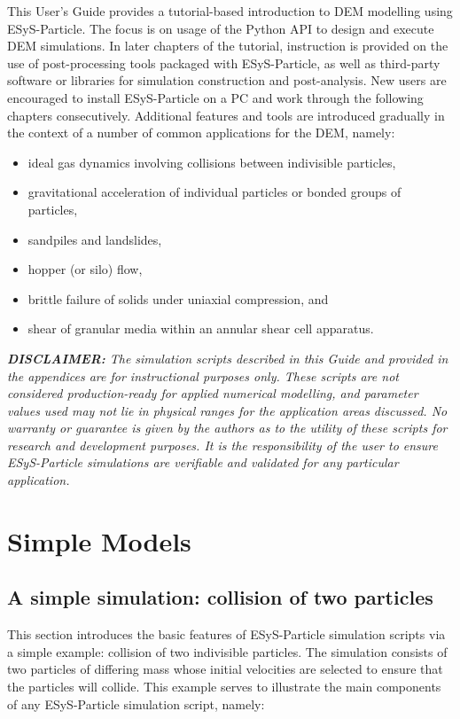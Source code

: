 This User's Guide provides a tutorial-based introduction to DEM modelling using ESyS-Particle. The focus is on usage of the Python API to design and execute DEM simulations. In later chapters of the tutorial, instruction is provided on the use of post-processing tools packaged with ESyS-Particle, as well as third-party software or libraries for simulation construction and post-analysis. New users are encouraged to install ESyS-Particle on a PC and work through the following chapters consecutively. Additional features and tools are introduced gradually in the context of a number of common applications for the DEM, namely:
\begin{itemize}
\item ideal gas dynamics involving collisions between indivisible particles,
\item gravitational acceleration of individual particles or bonded groups of particles,
\item sandpiles and landslides,
\item hopper (or silo) flow, 
\item brittle failure of solids under uniaxial compression, and
\item shear of granular media within an annular shear cell apparatus.
\end{itemize}

\vskip 5mm
\begin{minipage}{5.75in}
\emph{\textbf{DISCLAIMER:} The simulation scripts described in this Guide and provided in the appendices are for instructional purposes only. These scripts are not considered production-ready for applied numerical modelling, and parameter values used may not lie in physical ranges for the application areas discussed. No warranty or guarantee is given by the authors as to the utility of these scripts for research and development purposes. It is the responsibility of the user to ensure ESyS-Particle simulations are verifiable and validated for any particular application.}
\end{minipage}
\vskip 5mm

\chapter{Simple Models}
\section{A simple simulation: collision of two particles}

This section introduces the basic features of ESyS-Particle simulation scripts via a simple example: collision of two indivisible particles. The simulation consists of two particles of differing mass whose initial velocities are selected to ensure that the particles will collide. This example serves to illustrate the main components of any ESyS-Particle simulation script, namely:

